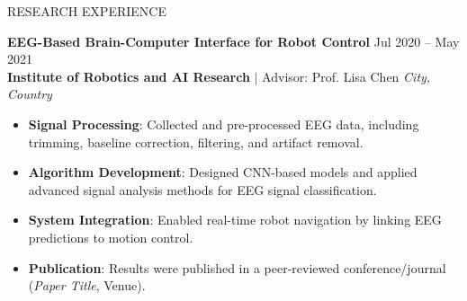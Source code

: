 \documentclass{resume} %
\begin{document}
\begin{rSection}{RESEARCH EXPERIENCE}
 
\textbf{EEG-Based Brain-Computer Interface for Robot Control} \hfill Jul 2020 -- May 2021\\
\textbf{Institute of Robotics and AI Research} $\mid$ Advisor: Prof. Lisa Chen \hfill \textit{City, Country}
\begin{itemize}
    \itemsep -3pt {}
    \item \textbf{Signal Processing}: Collected and pre-processed EEG data, including trimming, baseline correction, filtering, and artifact removal.  
    \item \textbf{Algorithm Development}: Designed CNN-based models and applied advanced signal analysis methods for EEG signal classification.  
    \item \textbf{System Integration}: Enabled real-time robot navigation by linking EEG predictions to motion control.  
    \item \textbf{Publication}: Results were published in a peer-reviewed conference/journal (\textit{Paper Title}, Venue).  
\end{itemize}
\end{rSection}


\end{document}
